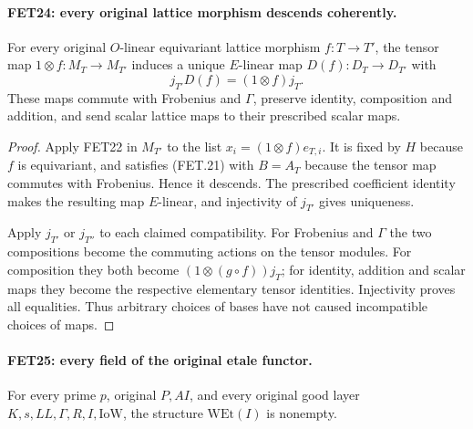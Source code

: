 \paragraph{FET24: every original lattice morphism descends coherently.}
\label{claim:FET24}
For every original $O$-linear equivariant lattice morphism
$f:T\to T'$, the tensor map $1\otimes f:M_T\to M_{T'}$
induces a unique $E$-linear map $D(f):D_T\to D_{T'}$ with
\[
                       j_{T'}D(f)=(1\otimes f)j_T.        \tag{FET.22}
\]
These maps commute with Frobenius and $\Gamma$, preserve identity,
composition and addition, and send scalar lattice maps to their
prescribed scalar maps.

\begin{proof}
Apply FET22 in $M_{T'}$ to the list
$x_i=(1\otimes f)e_{T,i}$. It is fixed by $H$ because $f$
is equivariant, and satisfies (FET.21) with $B=A_T$ because
the tensor map commutes with Frobenius. Hence it descends.
The prescribed coefficient identity makes the resulting map
$E$-linear, and injectivity of $j_{T'}$ gives uniqueness.

Apply $j_{T'}$ or $j_{T''}$ to each claimed compatibility.
For Frobenius and $\Gamma$ the two compositions become the
commuting actions on the tensor modules. For composition they
both become $(1\otimes(g\circ f))j_T$; for identity, addition
and scalar maps they become the respective elementary tensor
identities. Injectivity proves all equalities. Thus arbitrary
choices of bases have not caused incompatible choices of maps.
\end{proof}

\paragraph{FET25: every field of the original etale functor.}
\label{claim:FET25}
For every prime $p$, original $P,AI$, and every original good
layer $K,s,LL,\Gamma,R,I,\mathrm{IoW}$, the structure
$\mathrm{WEt}(I)$ is nonempty.

